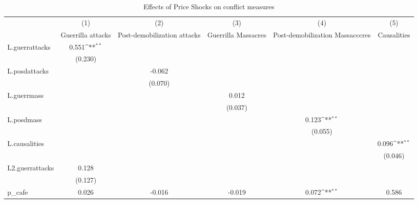 \begin{table}[htbp]\centering
\def\sym#1{\ifmmode^{#1}\else\(^{#1}\)\fi}
\caption{Effects of Price Shocks on conflict measures}
\begin{tabular}{l*{5}{c}}
\hline\hline
                &\multicolumn{1}{c}{(1)}&\multicolumn{1}{c}{(2)}&\multicolumn{1}{c}{(3)}&\multicolumn{1}{c}{(4)}&\multicolumn{1}{c}{(5)}\\
                &\multicolumn{1}{c}{Guerrilla attacks}&\multicolumn{1}{c}{Post-demobilization attacks}&\multicolumn{1}{c}{Guerrilla Massacres}&\multicolumn{1}{c}{Post-demobilization Massacccres}&\multicolumn{1}{c}{Causalities}\\
\hline
L.guerrattacks  &    0.551\sym{**} &                  &                  &                  &                  \\
                &  (0.230)         &                  &                  &                  &                  \\
[1em]
L.posdattacks   &                  &   -0.062         &                  &                  &                  \\
                &                  &  (0.070)         &                  &                  &                  \\
[1em]
L.guerrmass     &                  &                  &    0.012         &                  &                  \\
                &                  &                  &  (0.037)         &                  &                  \\
[1em]
L.posdmass      &                  &                  &                  &    0.123\sym{**} &                  \\
                &                  &                  &                  &  (0.055)         &                  \\
[1em]
L.causalities   &                  &                  &                  &                  &    0.096\sym{**} \\
                &                  &                  &                  &                  &  (0.046)         \\
[1em]
L2.guerrattacks &    0.128         &                  &                  &                  &                  \\
                &  (0.127)         &                  &                  &                  &                  \\
[1em]
p\_cafe          &    0.026         &   -0.016         &   -0.019         &    0.072\sym{**} &    0.586         \\

\end{tabular}
\end{table}
